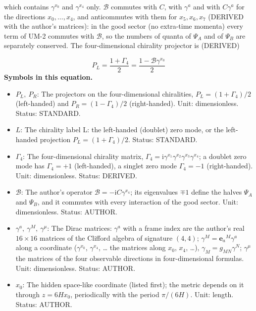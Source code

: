 \documentclass[
  10pt,
]{article}
\providecommand{\tightlist}{%
  \setlength{\itemsep}{0pt}\setlength{\parskip}{0pt}}
\begin{document}
which contains \(\gamma^{x_0}\) and \(\gamma^{x_4}\) only.
\(\mathcal{B}\) commutes with \(C\), with \(\gamma^a\) and with
\(C\gamma^a\) for the directions \(x_0, \dots, x_4\), and anticommutes
with them for \(x_5, x_6, x_7\) (DERIVED with the author's matrices): in
the good sector (no extra-time momenta) every term of UM-2 commutes with
\(\mathcal{B}\), so the numbers of quanta of \(\Psi_A\) and of
\(\Psi_B\) are separately conserved. The four-dimensional chirality
projector is (DERIVED)

\[ P_L = \frac{1 + \Gamma_4}{2} = \frac{1 - \mathcal{B}\gamma^{x_0}}{2} \]
\textbf{Symbols in this equation.}

\begin{itemize}
\tightlist
\item
  \(P_L,\ P_R\): The projectors on the four-dimensional chiralities,
  \(P_L = (1 + \Gamma_4)/2\) (left-handed) and
  \(P_R = (1 - \Gamma_4)/2\) (right-handed). Unit: dimensionless.
  Status: STANDARD.
\item
  \(L\): The chirality label L: the left-handed (doublet) zero mode, or
  the left-handed projection \(P_L = (1 + \Gamma_4)/2\). Status:
  STANDARD.
\item
  \(\Gamma_4\): The four-dimensional chirality matrix,
  \(\Gamma_4 = \mathrm{i}\gamma^{x_1}\gamma^{x_2}\gamma^{x_3}\gamma^{x_4}\);
  a doublet zero mode has \(\Gamma_4 = +1\) (left-handed), a singlet
  zero mode \(\Gamma_4 = -1\) (right-handed). Unit: dimensionless.
  Status: DERIVED.
\item
  \(\mathcal{B}\): The author's operator
  \(\mathcal{B} = -\mathrm{i}C\gamma^{x_4}\); its eigenvalues \(\mp1\)
  define the halves \(\Psi_A\) and \(\Psi_B\), and it commutes with
  every interaction of the good sector. Unit: dimensionless. Status:
  AUTHOR.
\item
  \(\gamma^a,\ \gamma^M,\ \gamma^\mu\): The Dirac matrices: \(\gamma^a\)
  with a frame index are the author's real \(16 \times 16\) matrices of
  the Clifford algebra of signature \((4, 4)\);
  \(\gamma^M = \mathbf{e}_a{}^M\gamma^a\) along a coordinate
  (\(\gamma^{x_0}\), \(\gamma^{x_4}\), \ldots{} the matrices along
  \(x_0\), \(x_4\), \ldots), \(\gamma_M = g_{MN}\gamma^N\);
  \(\gamma^\mu\) the matrices of the four observable directions in
  four-dimensional formulas. Unit: dimensionless. Status: AUTHOR.
\item
  \(x_0\): The hidden space-like coordinate (listed first); the metric
  depends on it through \(z = 6Hx_0\), periodically with the period
  \(\pi/(6H)\). Unit: length. Status: AUTHOR.
\end{itemize}
\end{document}
